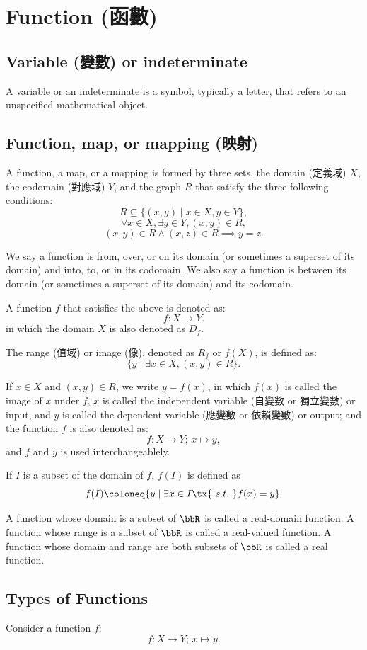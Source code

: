 \section{Function (函數)}
\subsection{Variable (變數) or indeterminate}
A variable or an indeterminate is a symbol, typically a letter, that refers to an unspecified mathematical object.
\subsection{Function, map, or mapping (映射)}
A function, a map, or a mapping is formed by three sets, the domain (定義域) $X$, the codomain (對應域) $Y$, and the graph $R$ that satisfy the three following conditions:
\[R\subseteq \{(x,y)\mid x\in X,y\in Y\},\]
\[\forall x\in X,\exists y\in Y,\left(x,y\right)\in R ,\]
\[ (x,y)\in R\land (x,z)\in R\implies y=z.\]

We say a function is from, over, or on its domain (or sometimes a superset of its domain) and into, to, or in its codomain. We also say a function is between its domain (or sometimes a superset of its domain) and its codomain.

A function $f$ that satisfies the above is denoted as:
\[f\colon X\to Y.\]
in which the domain $X$ is also denoted as $D_f$.

The range (值域) or image (像), denoted as $R_f$ or $f(X)$, is defined as:
\[\{ y \mid \exists x \in X, (x, y) \in R \}.\]

If $x\in X$ and $(x, y) \in R$, we write $y = f(x)$, in which $f(x)$ is called the image of $x$ under $f$, $x$ is called the independent variable (自變數 or 獨立變數) or input, and $y$ is called the dependent variable (應變數 or 依賴變數) or output; and the function $f$ is also denoted as:
\[f \colon X \to Y;\, x \mapsto y,\]
and $f$ and $y$ is used interchangeablely.

If $I$ is a subset of the domain of $f$, $f(I)$ is defined as
\[f(I)\coloneq\{y\mid\exists x\in I \tx{\ s.t.\ }f(x)=y\}.\]

A function whose domain is a subset of $\bbR$ is called a real-domain function. A function whose range is a subset of $\bbR$ is called a real-valued function. A function whose domain and range are both subsets of $\bbR$ is called a real function.
\subsection{Types of Functions}
Consider a function $f$:
\[f\colon X\to Y;\,x\mapsto y.\]
